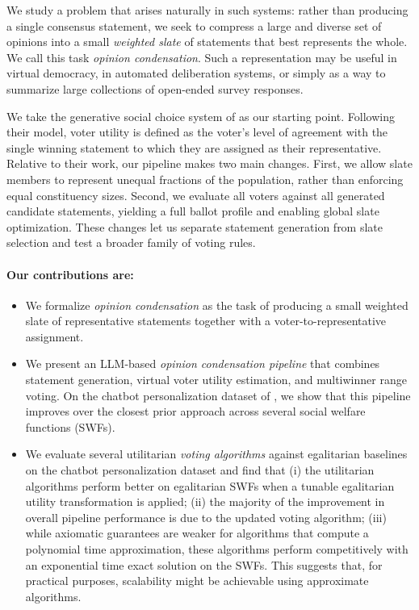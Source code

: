 \documentclass[11pt]{article}
\begin{document}
We study a problem that arises naturally in such systems: rather than producing a single consensus statement, we seek to compress a large and diverse set of opinions into a small \emph{weighted slate} of statements that best represents the whole. We call this task \emph{opinion condensation}. Such a representation may be useful in virtual democracy, in automated deliberation systems, or simply as a way to summarize large collections of open-ended survey responses.

We take the generative social choice system of \citet{fish-v2} as our starting point. Following their model, voter utility is defined as the voter's level of agreement with the single winning statement to which they are assigned as their representative. Relative to their work, our pipeline makes two main changes. First, we allow slate members to represent unequal fractions of the population, rather than enforcing equal constituency sizes. Second, we evaluate all voters against all generated candidate statements, yielding a full ballot profile and enabling global slate optimization.
These changes let us separate statement generation from slate selection and test a broader family of voting rules.

\paragraph{Our contributions are:}
\begin{itemize}
    \item We formalize \emph{opinion condensation} as the task of producing a small weighted slate of representative statements together with a voter-to-representative assignment.
    \item We present an LLM-based \emph{opinion condensation pipeline} that combines statement generation, virtual voter utility estimation, and multiwinner range voting.
    On the chatbot personalization dataset of \citet{fish-v2}, we show that this pipeline improves over the closest prior approach across several social welfare functions (SWFs).
    \item We evaluate several utilitarian \emph{voting algorithms} against egalitarian baselines on the chatbot personalization dataset and find that (i) the utilitarian algorithms perform better on egalitarian SWFs when a tunable egalitarian utility transformation is applied; (ii) the majority of the improvement in overall pipeline performance is due to the updated voting algorithm; (iii) while axiomatic guarantees are weaker for algorithms that compute a polynomial time approximation, these algorithms perform competitively with an exponential time exact solution on the SWFs. This suggests that, for practical purposes, scalability might be achievable using approximate algorithms.
\end{itemize}
\end{document}
